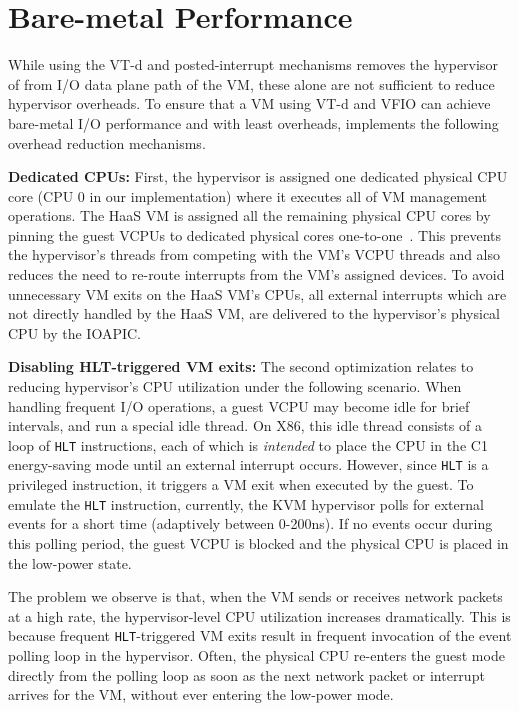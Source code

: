 \section{Bare-metal Performance}
\vspace{-0.05in}
While using the VT-d and posted-interrupt mechanisms removes
the hypervisor of from I/O data plane path of the VM, these alone are
not sufficient to reduce hypervisor overheads.
To ensure that a VM using VT-d and VFIO can achieve bare-metal
I/O performance and with least overheads, \na implements
the following overhead reduction mechanisms.

{\bf Dedicated CPUs:}
First, the hypervisor is assigned one dedicated physical CPU core
(CPU 0 in our implementation)
where it executes all of VM management operations.
The HaaS VM is assigned all the remaining physical
CPU cores by pinning the guest VCPUs to
dedicated physical cores one-to-one~\cite{amit:2015}.
This prevents the hypervisor's threads
from competing with the VM's VCPU threads and
also reduces the need to re-route interrupts
from the VM's assigned devices.
To avoid unnecessary VM exits on the HaaS VM's CPUs,
all external interrupts which are not directly handled
by the HaaS VM, are delivered to the hypervisor's physical
CPU by the IOAPIC.

{\bf Disabling  HLT-triggered VM exits:}
The second optimization relates to reducing hypervisor's CPU utilization
under the following scenario.
When handling frequent I/O operations,
a guest VCPU  may become idle for brief intervals, and
run a special idle thread.
On X86, this idle thread consists of a loop of {\tt HLT} instructions,
each of which is {\em intended} to place the CPU in the C1 energy-saving mode
until an external interrupt occurs.
However, since {\tt HLT} is a privileged instruction, it triggers a
VM exit when executed by the guest.
To emulate the {\tt HLT} instruction, currently, the KVM hypervisor
polls for external events for a short time
(adaptively between 0-200ns). If no events occur during this
polling period, the guest VCPU is blocked and the physical CPU
is placed in the low-power state.

The problem we observe is that, when the VM sends or receives network packets
at a high rate, the hypervisor-level CPU utilization increases
dramatically. This is because frequent {\tt HLT}-triggered VM exits
result in frequent invocation of the event polling loop in the hypervisor.
Often, the physical CPU re-enters the guest mode directly
from the polling loop as soon as the next network packet
or interrupt arrives for the VM, without ever entering the low-power mode.

